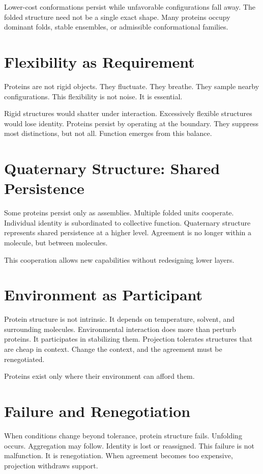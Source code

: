\documentclass[11pt,twoside,openright]{book}
\begin{document}
Lower-cost conformations persist while unfavorable configurations fall away. The folded structure need not be a single exact shape. Many proteins occupy dominant folds, stable ensembles, or admissible conformational families.

\section*{Flexibility as Requirement}

Proteins are not rigid objects. They fluctuate. They breathe. They sample nearby configurations. This flexibility is not noise. It is essential.

Rigid structures would shatter under interaction. Excessively flexible structures would lose identity. Proteins persist by operating at the boundary. They suppress most distinctions, but not all. Function emerges from this balance.

\section*{Quaternary Structure: Shared Persistence}

Some proteins persist only as assemblies. Multiple folded units cooperate. Individual identity is subordinated to collective function. Quaternary structure represents shared persistence at a higher level. Agreement is no longer within a molecule, but between molecules.

This cooperation allows new capabilities without redesigning lower layers.

\section*{Environment as Participant}

Protein structure is not intrinsic. It depends on temperature, solvent, and surrounding molecules. Environmental interaction does more than perturb proteins. It participates in stabilizing them. Projection tolerates structures that are cheap in context. Change the context, and the agreement must be renegotiated.

Proteins exist only where their environment can afford them.

\section*{Failure and Renegotiation}

When conditions change beyond tolerance, protein structure fails. Unfolding occurs. Aggregation may follow. Identity is lost or reassigned. This failure is not malfunction. It is renegotiation. When agreement becomes too expensive, projection withdraws support.
\end{document}
